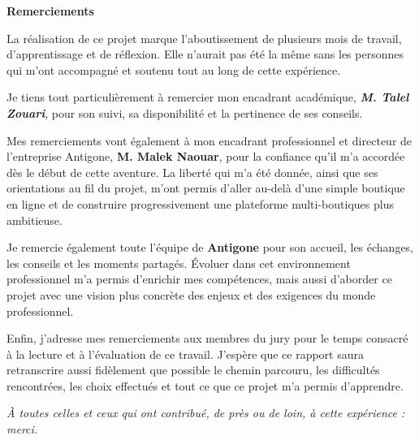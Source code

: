 \begin{center}
\textbf{\Huge Remerciements}
\end{center}

\vspace{1cm}

\hspace{0.5cm}La réalisation de ce projet marque l'aboutissement de plusieurs mois de travail, d'apprentissage et de réflexion. Elle n'aurait pas été la même sans les personnes qui m'ont accompagné et soutenu tout au long de cette expérience.

\vspace{0.5cm}

Je tiens tout particulièrement à remercier mon encadrant académique, \textbf{\textit{M. Talel Zouari}}, pour son suivi, sa disponibilité et la pertinence de ses conseils. 

\vspace{0.5cm}

Mes remerciements vont également à mon encadrant professionnel et directeur de l'entreprise Antigone, \textbf{M. Malek Naouar}, pour la confiance qu'il m'a accordée dès le début de cette aventure. La liberté qui m'a été donnée, ainsi que ses orientations au fil du projet, m'ont permis d'aller au-delà d'une simple boutique en ligne et de construire progressivement une plateforme multi-boutiques plus ambitieuse.

\vspace{0.5cm}

Je remercie également toute l'équipe de \textbf{Antigone} pour son accueil, les échanges, les conseils et les moments partagés. Évoluer dans cet environnement professionnel m'a permis d'enrichir mes compétences, mais aussi d'aborder ce projet avec une vision plus concrète des enjeux et des exigences du monde professionnel.

\vspace{0.5cm}

Enfin, j'adresse mes remerciements aux membres du jury pour le temps consacré à la lecture et à l'évaluation de ce travail. J'espère que ce rapport saura retranscrire aussi fidèlement que possible le chemin parcouru, les difficultés rencontrées, les choix effectués et tout ce que ce projet m'a permis d'apprendre.

\vspace{0.7cm}

\begin{center}
\textit{À toutes celles et ceux qui ont contribué, de près ou de loin, à cette expérience : merci.}
\end{center}